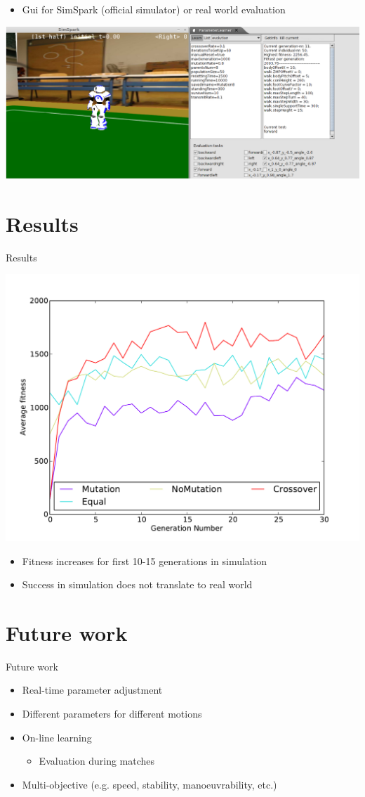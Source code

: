 \documentclass{beamer}
\begin{document}
\begin{frame}
	\begin{itemize}
		\item Gui for SimSpark (official simulator) or real world evaluation
	\end{itemize}
	\includegraphics[width=\textwidth]{GUI}
\end{frame}

\section{Results}
\begin{frame}{Results}
	\begin{center}
		\includegraphics[width=.5\textwidth]{relevant_avg}
	\end{center}
\begin{itemize}
	\item Fitness increases for first 10-15 generations in simulation
	\item Success in simulation does not translate to real world
\end{itemize}
\end{frame}

\section{Future work}
\begin{frame}{Future work}
\begin{itemize}
\item Real-time parameter adjustment
\item Different parameters for different motions
\item On-line learning
	\begin{itemize}
		\item Evaluation during matches
	\end{itemize}
\item Multi-objective (e.g. speed, stability, manoeuvrability, etc.)
\end{itemize}
\end{frame}
\end{document}
